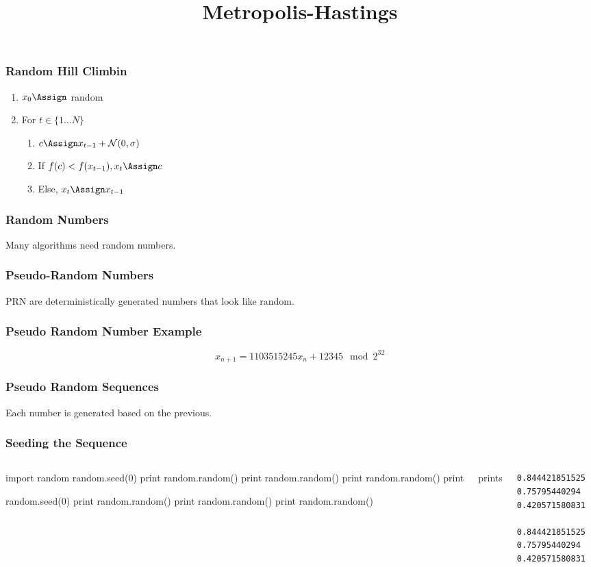 
\title{Metropolis-Hastings}

\frame{\maketitle}

\begin{frame}[fragile]
\frametitle{Random Hill Climbin}
\begin{enumerate}
\item $x_0 \Assign $ random
\item For $t \in \{1 \ldots N \}$
\begin{enumerate}[a]
\item $c \Assign x_{t-1} + \mathcal{N}(0,\sigma)$
\item If $f(c) < f(x_{t-1}), x_t \Assign c$
\item Else, $x_t \Assign x_{t-1}$
\end{enumerate}
\end{enumerate}
\end{frame}

\begin{frame}[fragile]
\frametitle{Random Numbers}
Many algorithms need random numbers.
\end{frame}

\begin{frame}[fragile]
\frametitle{Pseudo-Random Numbers}
PRN are deterministically generated numbers that look like random.
\end{frame}

\begin{frame}[fragile]
\frametitle{Pseudo Random Number Example}

\[
x_{n+1} = 1103515245 x_n + 12345 \mod 2^{32}
\]

\end{frame}

\begin{frame}[fragile]
\frametitle{Pseudo Random Sequences}

Each number is generated based on the previous.

\end{frame}

\begin{frame}[fragile]
\frametitle{Seeding the Sequence}
\begin{columns}
\begin{python}
import random
random.seed(0)
print random.random()
print random.random()
print random.random()
print 

random.seed(0)
print random.random()
print random.random()
print random.random()
\end{python}
prints
\begin{verbatim}
0.844421851525
0.75795440294
0.420571580831

0.844421851525
0.75795440294
0.420571580831
\end{verbatim}

\end{columns}
\end{frame}

